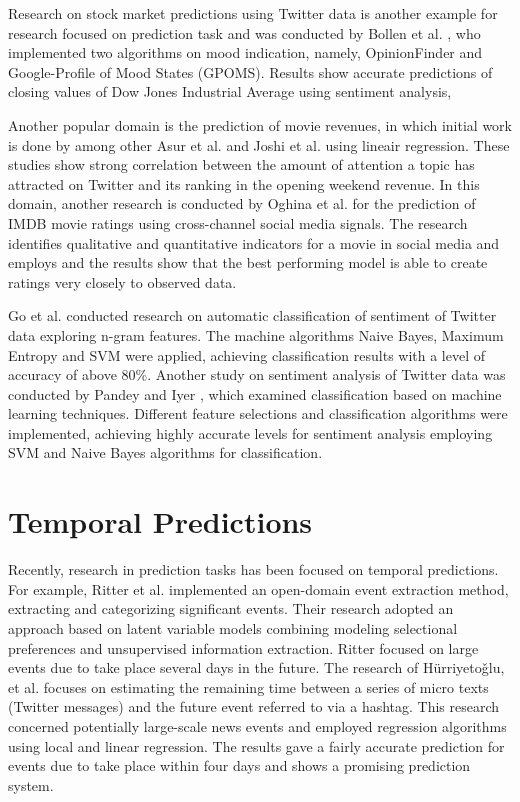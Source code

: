 Research on stock market predictions using Twitter data is another example for research focused on prediction task and was conducted by Bollen et al. \cite{Bollen}, who implemented two algorithms on mood indication, namely, OpinionFinder and Google-Profile of Mood States (GPOMS). Results show accurate predictions of closing values of Dow Jones Industrial Average using sentiment analysis,

Another popular domain is the prediction of movie revenues, in which initial work is done by among other Asur et al. \cite{asur} and Joshi et al. \cite{joshi} using lineair regression. These studies show strong correlation between the amount of attention a topic has attracted on Twitter and its ranking in the opening weekend revenue. In this domain, another research is conducted by Oghina et al. \cite{Oghina} for the prediction of IMDB movie ratings using cross-channel social media signals. The research identifies qualitative and quantitative indicators for a movie in social media and employs and the results show that the best performing model is able to create ratings very closely to observed data.

Go et al.\cite{go} conducted research on automatic classification of sentiment of Twitter data exploring n-gram features. The machine algorithms Naive Bayes, Maximum Entropy and SVM were applied, achieving classification results with  a level of accuracy of above 80\%. Another study on sentiment analysis of Twitter data was conducted by Pandey and Iyer \cite{pandey}, which examined classification based on machine learning techniques. Different feature selections and classification algorithms were implemented, achieving highly accurate levels for sentiment analysis employing SVM and Naive Bayes algorithms for classification.

\section{Temporal Predictions}
Recently, research in prediction tasks has been focused on temporal predictions. For example, Ritter et al.\cite{Ritter} implemented an open-domain event extraction method, extracting and categorizing significant events. Their research adopted an approach based on latent variable models combining modeling selectional preferences and unsupervised information extraction. Ritter focused on large events due to take place several days in the future. The research of H\"urriyeto\v{g}lu, et al. \cite{hurriye} focuses on estimating the remaining time between a series of micro texts (Twitter messages) and the future event referred to via a hashtag. This research concerned potentially large-scale news events and employed regression algorithms using local and linear regression. The results gave a fairly accurate prediction for events due to take place within four days and shows a promising prediction system.

